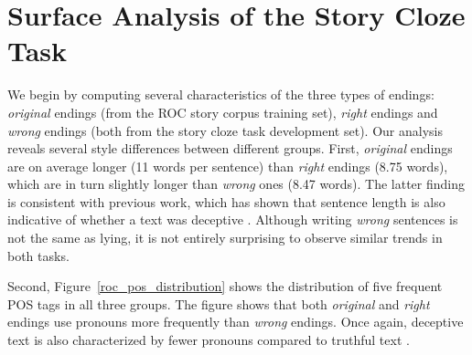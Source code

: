 \documentclass[11pt,a4paper]{article}
\newcommand{\figref}[1]{Figure~\ref{#1}}
\newcommand{\isection}[2]{\section{#1}\label{ssec:#2}}
\newcommand{\resolved}[1]{}
\newcommand{\ms}[1]{{\color{cyan}\{\textit{#1}\}$_{ms}$}}
\newcommand{\roy}[1]{{\color{orange}\textsc{[#1 --rs]}}}
\newcommand{\yc}[1]{{\color{bblue}\{\textit{#1}\}$_{yc}$}}
\renewcommand{\roy}[1]{{\color{orange}[#1 --rs]}}
\renewcommand{\roy}[1]{#1}
\renewcommand{\yc}[1]{}
\begin{document}
\isection{Surface Analysis of the Story Cloze Task}{Surface}
We begin by computing several characteristics of the three types of endings: {\it original} endings (from the ROC story corpus training set), {\it right} endings and {\it wrong} endings (both from the story cloze task development set).
Our analysis  reveals several style differences between different groups. 
First, {\it original} endings are on average longer (11 words per
sentence) than {\it right} endings (8.75 words), which are in turn
slightly longer than {\it wrong} ones (8.47 words). 
The latter finding is consistent with previous work, which has shown that sentence length is also indicative of whether a text was deceptive \cite{yancheva2013automatic,qin2004exploratory}. 
Although writing {\it wrong} sentences is not the same as lying, it is not entirely surprising to observe similar trends in both tasks.

Second, \figref{roc_pos_distribution} shows the distribution of five frequent POS tags in all three groups. 
The figure shows that both {\it original} and {\it right} endings use pronouns more frequently than {\it wrong} endings.
Once again, deceptive text is also characterized by fewer pronouns compared to truthful text \cite{Newman:2003}.
 \resolved{\yc{Is there literature that may have shown that (1) pronouns correlate with coherent text, and/or (2) referencing characters by proper nouns shows a way of cognitive distancing...?}}
 \resolved{\ms{The proper noun thing is prolly related to the task design, which stated that people had to use at least one of the characters; research shows people usually use more other references when lying, but it's not clear whether there's a pronoun/proper noun distinction.}}
  \resolved{\roy{Good point! This is tricky. On the one hand, it hurts our story by saying that the difference is not really the general task by itself, but also the constraints put by  Nasrin et al. It also forces us to bash them some more. Or we can just ignore it...} }
  \resolved{\yc{Ok! I resolved all comments above and also commented out the comment on how wrong/right endings use more proper nouns compared to the original endings. I think it's the best not to talk about this.}}
\end{document}
